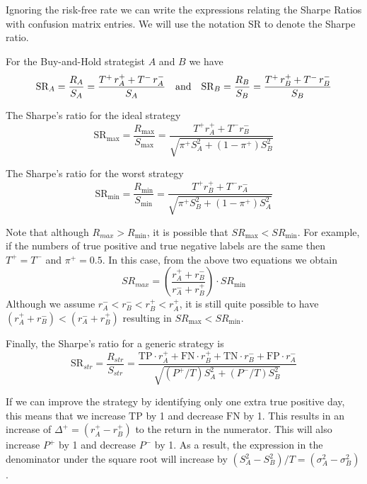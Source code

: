 \documentclass{article}
\begin{document}
Ignoring the risk-free rate we can write the expressions relating the Sharpe Ratios with confusion matrix entries.
We will use the notation $\text{SR}$ to denote the Sharpe ratio.

For the Buy-and-Hold strategist $A$ and $B$ we have
\begin{equation}
        \text{SR}_{A}=\frac{R_{A}}{S_{A}} =
        \frac{T^{+}\,r_{A}^{+} + T^{-}\, r_{A}^{-}}{S_{A}}
        \quad \hbox{and} \quad 
         \text{SR}_{B}=\frac{R_{B}}{S_{B}} =
        \frac{T^{+}\,r_{B}^{+} + T^{-}\, r_{B}^{-}}{S_{B}}
\end{equation}

The Sharpe's ratio for the ideal strategy
\begin{equation}
    \text{SR}_{\max}=\frac{R_{\max}}{S_{\max}} = \frac{T^{+}r_{A}^{+}+T^{-}r_{B}^{-}}
    {\sqrt{ \pi^{+} S_{A}^{2} +(1-\pi^{+})S_{B}^{2}}}
\end{equation}

The Sharpe's ratio for the worst strategy
\begin{equation}
    \text{SR}_{\min}=\frac{R_{\min}}{S_{\min}} = \frac{T^{+}r_{B}^{+}+T^{-}r_{A}^{-}}
    {\sqrt{ \pi^{+} S_{B}^{2} +(1-\pi^{+})S_{A}^{2}}}
\end{equation}

Note that although $R_{max}>R_{\min}$, it is possible that
$SR_{\max} < SR_{\min}$. For example, if the numbers of true positive and true negative labels are the same then $T^{+}=T^{-}$ and $\pi^{+}=0.5$. In this case, from the above two equations we obtain
\begin{equation}
    SR_{max} =\left(\frac{r_{A}^{+}+r_{B}^{-}}{r_{A}^{-} + r_{B}^{+}}\right)\cdot SR_{\min}
\end{equation}
Although we assume $r_{A}^{-}<r_{B}^{-}<r_{B}^{+}<r_{A}^{+}$, it is still 
quite possible to have $(r_{A}^{+}+r_{B}^{-}) < (r_{A}^{-} + r_{B}^{+})$ resulting in  $SR_{\max} < SR_{\min}$. 

Finally, the Sharpe's ratio for a generic strategy is
\begin{equation}
\text{SR}_{str}=\frac{R_{str}}{S_{str}} =
\frac{\text{TP}\cdot r_{A}^{+} + \text{FN}\cdot r_{B}^{+} + \text{TN}\cdot r_{B}^{-} +
    \text{FP}\cdot r_{A}^{-}}
{\sqrt{
\left( P^{+}/{T} \right)  S_{A}^{2} +
\left(P^{-}/{T}\right) S_{B}^{2} }}
\label{sgarpe_generic}
\end{equation}

If we can improve the strategy by identifying only one extra true positive day,
this means that we increase $\text{TP}$ by 1 and decrease $\text{FN}$ by 1. This results in an increase of $\Delta^{+}=(r_{A}^{+}-r_{B}^{+})$ to the return in the numerator. This will also increase $P^{+}$ by 1 and decrease $P^{-}$ by 1. As a result, the expression in the denominator under the square root will increase by 
$(S_{A}^{2}-S_{B}^{2})/T=(\sigma_{A}^{2}-\sigma_{B}^{2})$.
\end{document}
